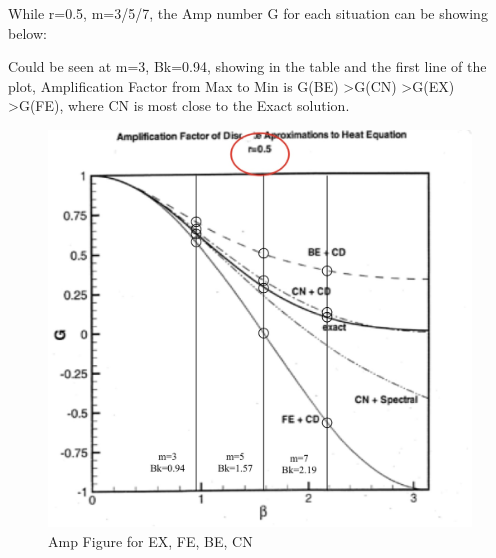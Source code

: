 \documentclass[12pt]{article}
\begin{document}
While r=0.5, m=3/5/7, the Amp number G for each situation can be showing below:

\begin{center}

\end{center}


Could be seen at m=3, Bk=0.94, showing in the table and the first line of the plot, Amplification Factor from Max to Min is G(BE) \textgreater G(CN) \textgreater G(EX) \textgreater G(FE), where CN is most close to the Exact solution.\\


\begin{figure}[H] 
\centering 
\includegraphics[scale=0.6]{Amp Figure.jpg} 
\caption{Amp Figure for EX, FE, BE, CN} 
\label{TDMA Solver code} 
\end{figure}
\end{document}

